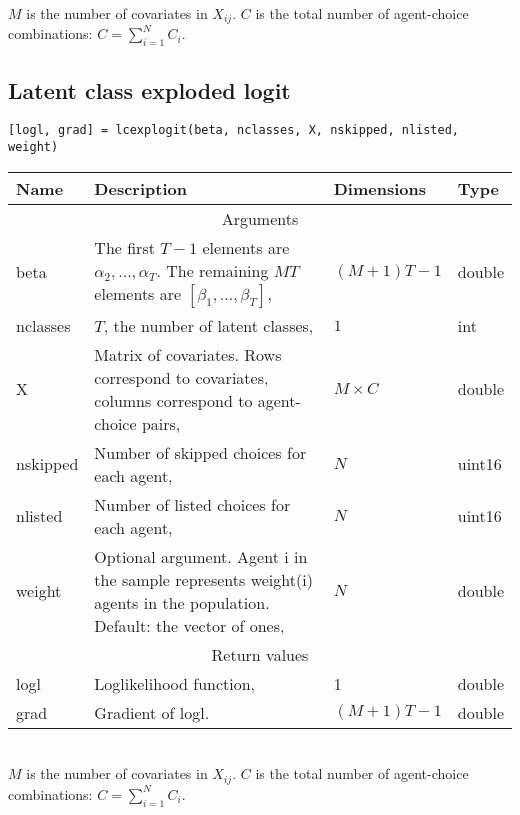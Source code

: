 \documentclass[12pt]{article}
\begin{document}
$M$ is the number of covariates in $X_{ij}$. $C$ is the total number of agent-choice combinations: $C=\sum_{i=1}^NC_i$.
\clearpage
\subsection{Latent class exploded logit}

\texttt{[logl, grad] = lcexplogit(beta, nclasses, X, nskipped, nlisted, weight)}

\begin{tabular}{lp{}ll}\\\hline\hline
	Name 		& Description & Dimensions & Type\\\hline
	\multicolumn{4}{c}{Arguments}\\\hline
	beta 		& The first $T-1$ elements are $\alpha_2,\dots,\alpha_T$. The remaining $MT$ elements are $[\beta_1,\dots,\beta_T]$, & $(M+1)T-1$ & double\\
	nclasses    & $T$, the number of latent classes, & $1$ & int \\
	X 			& Matrix of covariates. Rows correspond to covariates, columns correspond to agent-choice pairs, & $M\times C$ & double \\
	nskipped 	& Number of skipped choices for each agent, & $N$ & uint16 \\
	nlisted 	& Number of listed choices for each agent, & $N$ & uint16 \\
	weight		& Optional argument. Agent i in the sample represents weight(i) agents in the population. Default: the vector of ones, & $N$ & double\\\hline
	
	\multicolumn{4}{c}{Return values}\\\hline
	logl		& Loglikelihood function, & 1 & double\\
	grad		& Gradient of logl. & $(M+1)T-1$ & double\\\hline\hline
\end{tabular}\\

$M$ is the number of covariates in $X_{ij}$. $C$ is the total number of agent-choice combinations: $C=\sum_{i=1}^NC_i$.
\end{document}
